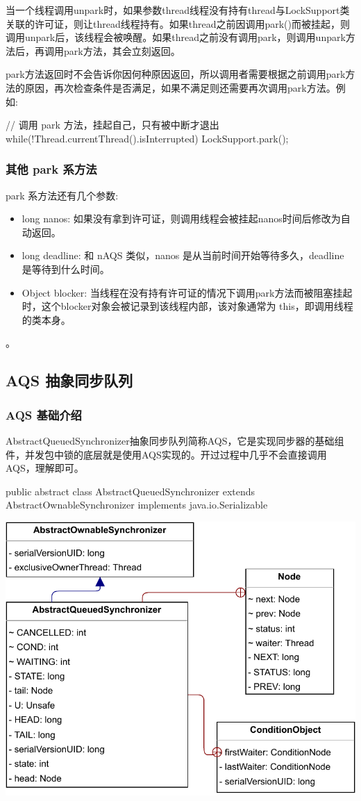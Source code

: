 当一个线程调用unpark时，如果参数thread线程没有持有thread与LockSupport类关联的许可证，则让thread线程持有。如果thread之前因调用park()而被挂起，则调用unpark后，该线程会被唤醒。如果thread之前没有调用park，则调用unpark方法后，再调用park方法，其会立刻返回。

park方法返回时不会告诉你因何种原因返回，所以调用者需要根据之前调用park方法的原因，再次检查条件是否满足，如果不满足则还需要再次调用park方法。例如:

\begin{Java}
// 调用 park 方法，挂起自己，只有被中断才退出
while(!Thread.currentThread().isInterrupted) {
    LockSupport.park();
}
\end{Java}

\subsubsection*{其他 park 系方法}

park 系方法还有几个参数:
\begin{itemize}
    \item long nanos: 如果没有拿到许可证，则调用线程会被挂起nanos时间后修改为自动返回。
    \item long deadline: 和 nAQS 类似，nanos 是从当前时间开始等待多久，deadline 是等待到什么时间。
    \item Object blocker: 当线程在没有持有许可证的情况下调用park方法而被阻塞挂起时，这个blocker对象会被记录到该线程内部，该对象通常为 this，即调用线程的类本身。
\end{itemize}。

\subsection{AQS 抽象同步队列}
\subsubsection{AQS 基础介绍}

AbstractQueuedSynchronizer抽象同步队列简称AQS，它是实现同步器的基础组件，并发包中锁的底层就是使用AQS实现的。开过过程中几乎不会直接调用 AQS，理解即可。

\begin{Java}
public abstract class AbstractQueuedSynchronizer extends AbstractOwnableSynchronizer implements java.io.Serializable
\end{Java}

\begin{center}
    \includegraphics[width=0.6\linewidth]{../../Images/AQS.pdf}
\end{center}

